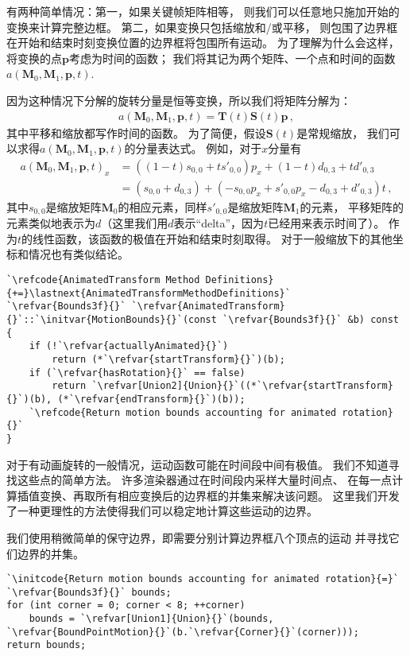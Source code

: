 有两种简单情况：第一，如果关键帧矩阵相等，
则我们可以任意地只施加开始的变换来计算完整边框。
第二，如果变换只包括缩放和/或平移，
则包围了边界框在开始和结束时刻变换位置的边界框将包围所有运动。
为了理解为什么会这样，将变换的点$\bm p$考虑为时间的函数；
我们将其记为两个矩阵、一个点和时间的函数$a(\bm M_0,\bm M_1,\bm p,t)$.

因为这种情况下分解的旋转分量是恒等变换，所以我们将矩阵分解为：
\begin{align*}
    a(\bm M_0,\bm M_1,\bm p,t)=\bm T(t)\bm S(t)\bm p\, ,
\end{align*}
其中平移和缩放都写作时间的函数。
为了简便，假设$\bm S(t)$是常规缩放，
我们可以求得$a(\bm M_0,\bm M_1,\bm p,t)$的分量表达式。
例如，对于$x$分量有
\begin{align*}
    a(\bm M_0,\bm M_1,\bm p,t)_x & =((1-t)s_{0,0}+ts'_{0,0})p_x+(1-t)d_{0,3}+td'_{0,3}                \\
                                 & =(s_{0,0}+d_{0,3})+(-s_{0,0}p_x+s'_{0,0}p_x-d_{0,3}+d'_{0,3})t\, ,
\end{align*}
其中$s_{0,0}$是缩放矩阵$\bm M_0$的相应元素，同样$s'_{0,0}$是缩放矩阵$\bm M_1$的元素，
平移矩阵的元素类似地表示为$d$（这里我们用$d$表示“delta”，因为$t$已经用来表示时间了）。
作为$t$的线性函数，该函数的极值在开始和结束时刻取得。
对于一般缩放下的其他坐标和情况也有类似结论。
\begin{lstlisting}
`\refcode{AnimatedTransform Method Definitions}{+=}\lastnext{AnimatedTransformMethodDefinitions}`
`\refvar{Bounds3f}{}` `\refvar{AnimatedTransform}{}`::`\initvar{MotionBounds}{}`(const `\refvar{Bounds3f}{}` &b) const {
    if (!`\refvar{actuallyAnimated}{}`)
        return (*`\refvar{startTransform}{}`)(b);
    if (`\refvar{hasRotation}{}` == false)
        return `\refvar[Union2]{Union}{}`((*`\refvar{startTransform}{}`)(b), (*`\refvar{endTransform}{}`)(b));
    `\refcode{Return motion bounds accounting for animated rotation}{}`
}
\end{lstlisting}

对于有动画旋转的一般情况，运动函数可能在时间段中间有极值。
我们不知道寻找这些点的简单方法。
许多渲染器通过在时间段内采样大量时间点、
在每一点计算插值变换、再取所有相应变换后的边界框的并集来解决该问题。
这里我们开发了一种更理性的方法使得我们可以稳定地计算这些运动的边界。

我们使用稍微简单的保守边界，即需要分别计算边界框八个顶点的运动
并寻找它们边界的并集。
\begin{lstlisting}
`\initcode{Return motion bounds accounting for animated rotation}{=}`
`\refvar{Bounds3f}{}` bounds;
for (int corner = 0; corner < 8; ++corner)
    bounds = `\refvar[Union1]{Union}{}`(bounds, `\refvar{BoundPointMotion}{}`(b.`\refvar{Corner}{}`(corner)));
return bounds;
\end{lstlisting}

